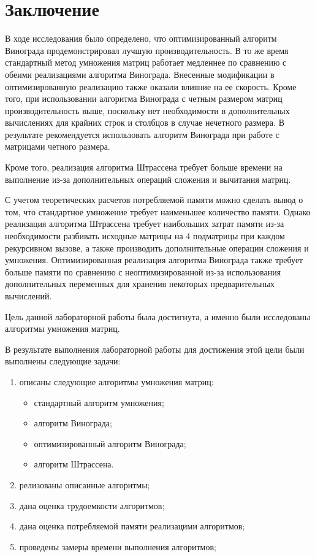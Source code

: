 \chapter*{Заключение}

В ходе исследования было определено, что оптимизированный алгоритм Винограда продемонстрировал лучшую производительность. 
В то же время стандартный метод умножения матриц работает медленнее по сравнению с обеими реализациями алгоритма Винограда. 
Внесенные модификации в оптимизированную реализацию также оказали влияние на ее скорость. 
Кроме того, при использовании алгоритма Винограда с четным размером матриц производительность выше, поскольку нет необходимости в дополнительных вычислениях для крайних строк и столбцов в случае нечетного размера. 
В результате рекомендуется использовать алгоритм Винограда при работе с матрицами четного размера.

Кроме того, реализация алгоритма Штрассена требует больше времени на выполнение из-за дополнительных операций сложения и вычитания матриц.

С учетом теоретических расчетов потребляемой памяти можно сделать вывод о том, что стандартное умножение требует наименьшее количество памяти. 
Однако реализация алгоритма Штрассена требует наибольших затрат памяти из-за необходимости разбивать исходные матрицы на 4 подматрицы при каждом рекурсивном вызове, а также производить дополнительные операции сложения и умножения. 
Оптимизированная реализация алгоритма Винограда также требует больше памяти по сравнению с неоптимизированной из-за использования дополнительных переменных для хранения некоторых предварительных вычислений. 

Цель данной лабораторной работы была достигнута, а именно были исследованы алгоритмы умножения матриц.

В результате выполнения лабораторной работы для достижения этой цели были выполнены следующие задачи:
\begin{enumerate}
    \item описаны следующие алгоритмы умножения матриц:
        \begin{itemize}
            \item стандартный алгоритм умножения;
            \item алгоритм Винограда;
            \item оптимизированный алгоритм Винограда;
            \item алгоритм Штрассена.
        \end{itemize}
    \item релизованы описанные алгоритмы;
    \item дана оценка трудоемкости алгоритмов;
    \item дана оценка потребляемой памяти реализацими алгоритмов;
    \item проведены замеры времени выполнения алгоритмов;
\end{enumerate}

